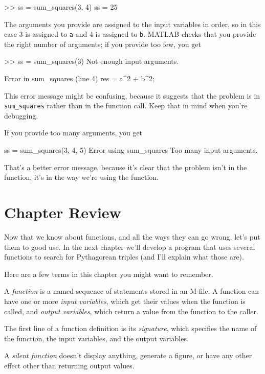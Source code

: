\begin{code}
>> ss = sum_squares(3, 4)
ss = 25
\end{code}

The arguments you provide are assigned to the input variables in
order, so in this case 3 is assigned to \lstinline{a} and 4 is assigned to
\lstinline{b}.  MATLAB checks that you provide the right number of arguments;
if you provide too few, you get

\begin{code}
>> ss = sum_squares(3)
Not enough input arguments.

Error in sum_squares (line 4)
    res = a^2 + b^2;
\end{code}

This error message might be confusing, because it suggests that
the problem is in \lstinline{sum_squares} rather than in the function call.
Keep that in mind when you're debugging.

If you provide too many arguments, you get

\begin{code}
ss = sum_squares(3, 4, 5)
Error using sum_squares
Too many input arguments.
\end{code}

That's a better error message, because it's clear that the problem isn't in the function, it's in the way we're using the function.

\section{Chapter Review}

Now that we know about functions, and all the ways they can go wrong, let's put them to good use.  In the next chapter we'll develop a program that uses several functions to search for Pythagorean triples (and I'll explain what those are).

Here are a few terms in this chapter you might want to remember.

A \emph{function} is a named sequence of statements stored in an M-file.
A function can have one or more \emph{input variables}, which get their values when the function is called, and \emph{output variables}, which return a value from the function to the caller.

The first line of a function definition is its \emph{signature}, which
specifies the name of the function, the input variables, and the
output variables.

A \emph{silent function} doesn't display anything, generate a figure, or have any other effect other than returning output values.


